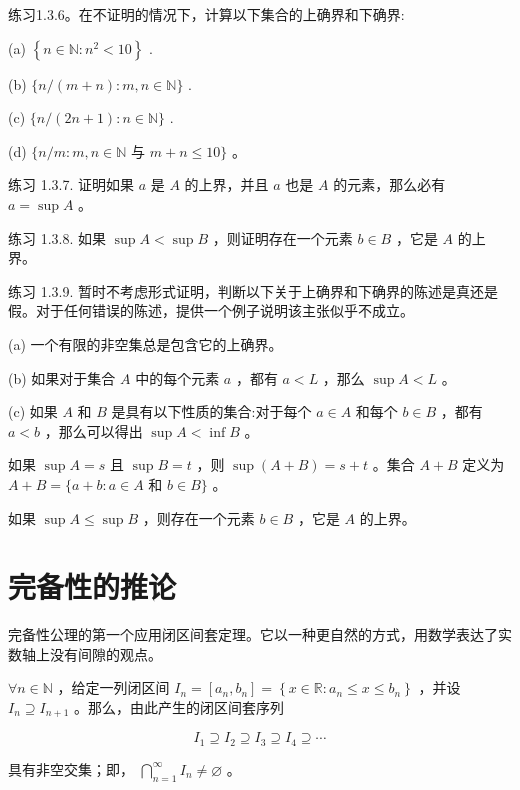 练习1.3.6。在不证明的情况下，计算以下集合的上确界和下确界:

(a) \(\left\{  {n \in  \mathbb{N} : {n}^{2} < {10}}\right\}\) .

(b) \(\{ n/\left( {m + n}\right)  : m,n \in  \mathbb{N}\}\) .

(c) \(\{ n/\left( {{2n} + 1}\right)  : n \in  \mathbb{N}\}\) .

(d) \(\{ n/m : m,n \in  \mathbb{N}\) 与 \(m + n \leq  {10}\}\) 。

练习 1.3.7. 证明如果 \(a\) 是 \(A\) 的上界，并且 \(a\) 也是 \(A\) 的元素，那么必有 \(a = \sup A\) 。

练习 1.3.8. 如果 \(\sup A < \sup B\) ，则证明存在一个元素 \(b \in  B\) ，它是 \(A\) 的上界。

练习 1.3.9. 暂时不考虑形式证明，判断以下关于上确界和下确界的陈述是真还是假。对于任何错误的陈述，提供一个例子说明该主张似乎不成立。

(a) 一个有限的非空集总是包含它的上确界。

(b) 如果对于集合 \(A\) 中的每个元素 \(a\) ，都有 \(a < L\) ，那么 \(\sup A < L\) 。

(c) 如果 \(A\) 和 \(B\) 是具有以下性质的集合:对于每个 \(a \in  A\) 和每个 \(b \in  B\) ，都有 \(a < b\) ，那么可以得出 \(\sup A < \inf B\) 。

如果 \(\sup A = s\) 且 \(\sup B = t\) ，则 \(\sup \left( {A + B}\right)  = s + t\) 。集合 \(A + B\) 定义为 \(A + B = \{ a + b : a \in  A\) 和 \(b \in  B\}\) 。

如果 \(\sup A \leq  \sup B\) ，则存在一个元素 \(b \in  B\) ，它是 \(A\) 的上界。

\section{完备性的推论}
\label{sec:1.4}

完备性公理的第一个应用闭区间套定理。它以一种更自然的方式，用数学表达了实数轴上没有间隙的观点。

\begin{Thm}[闭区间套定理]
  \label{thm:1.4.1}
   \(\forall n \in  \mathbb{N}\) ，给定一列闭区间 \({I}_{n} = \left\lbrack  {{a}_{n},{b}_{n}}\right\rbrack   = \left\{  {x \in  \mathbb{R} : {a}_{n} \leq  x \leq  {b}_{n}}\right\}\) ，并设 \({I}_{n}\supseteq {I}_{n + 1}\) 。那么，由此产生的闭区间套序列

\[
{I}_{1} \supseteq  {I}_{2} \supseteq  {I}_{3} \supseteq  {I}_{4} \supseteq  \cdots
\]

具有非空交集；即， \(\mathop{\bigcap }\limits_{{n = 1}}^{\infty }{I}_{n} \neq  \varnothing\) 。
\end{Thm}

